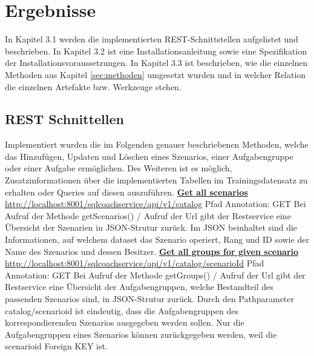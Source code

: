 \documentclass[fleqn,10pt,ngerman]{SelfArx}
\begin{document}
	\newpage
	\section{Ergebnisse}
In Kapitel 3.1 werden die implementierten REST-Schnittstellen aufgelistet und beschrieben. \newline In Kapitel 3.2 ist eine Installationsanleitung sowie eine Spezifikation der Installationsvoraussetzungen.\newline
In Kapitel 3.3 ist beschrieben, wie die einzelnen Methoden aus Kapitel \ref{sec:methoden} umgesetzt wurden und in welcher Relation die einzelnen Artefakte bzw. Werkzeuge stehen.

	
	\subsection{REST Schnittellen}
	Implementiert wurden die im Folgenden genauer beschriebenen Methoden, welche das Hinzufügen, Updaten und Löschen eines Szenarios, einer Aufgabengruppe oder einer Aufgabe ermöglichen. 
	Des Weiteren ist es möglich, Zusatzinformationen über die implementierten Tabellen im Trainingsdatensatz zu erhalten oder Queries auf diesen auszuführen.
	\newline
	\newline
	\noindent
	\underline{\textbf{Get all scenarios}}\newline
	\underline{http://localhost:8001/sqlcoachservice/api/v1/catalog}\newline
	Pfad Annotation: GET\newline
	\noindent Bei Aufruf der Methode getScenarios() / Aufruf der Url gibt der Restservice eine Übersicht der Szenarien in JSON-Strutur zurück. 
	Im JSON beinhaltet sind die Informationen, auf welchem dataset das Szenario operiert, Rang und ID sowie der Name des Szenarios und dessen Besitzer.
	\newline
	\newline
	\underline{\textbf{Get all groups for given scenario}}\newline
	\underline{http://localhost:8001/sqlcoachservice/api/v1/catalog}\newline\underline{/{scenarioId}}\newline
	Pfad Annotation: GET\newline
	Bei Aufruf der Methode getGroups() / Aufruf der Url gibt der Restservice eine Übersicht der Aufgabengruppen, welche Bestandteil des passenden Szenarios sind, in JSON-Strutur zurück. Durch den Pathparameter catalog/{scenarioid} ist eindeutig, dass die Aufgabengruppen des korrespondierenden Szenarios ausgegeben werden sollen. Nur die Aufgabengruppen eines Szenarios können zurückgegeben werden, weil die scenarioid  Foreign KEY ist.
\end{document}

